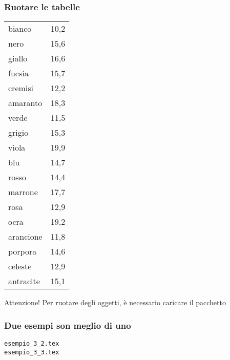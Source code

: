 \documentclass[svgnames,%
	ucs,%
	pdftex]{guitbeamer}
\begin{document}
\begin{frame}
  \frametitle{Ruotare le tabelle}
	\begin{LaTeXoutput}
		\begin{sideways}
		\begin{tabular}{lr}\\\toprule
		bianco 		& 10,2 \\
		nero   		& 15,6 \\
		giallo		& 16,6 \\
		fucsia		& 15,7 \\
		cremisi		& 12,2 \\
		amaranto	& 18,3 \\
		verde		& 11,5 \\
		grigio		& 15,3 \\
		viola		& 19,9 \\
		blu		& 14,7 \\
		rosso		& 14,4 \\
		marrone		& 17,7 \\
		rosa		& 12,9 \\
		ocra		& 19,2 \\
		arancione	& 11,8 \\
		porpora		& 14,6 \\
		celeste		& 12,9 \\
		antracite	& 15,1 \\
		\bottomrule
		\end{tabular}
		\end{sideways}
	\end{LaTeXoutput}
	\begin{block}{Attenzione!}
		Per ruotare degli oggetti, \`e necessario caricare il pacchetto 
	\end{block}
\end{frame}
\begin{frame}
  \frametitle{Due esempi son meglio di uno}
	\begin{center}
		\alert{\texttt{esempio\_3\_2.tex}}\\
		\alert{\texttt{esempio\_3\_3.tex}}
	\end{center}
\end{frame}
\end{document}

